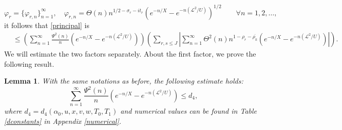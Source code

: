 \documentclass[reqno]{amsart}
\newtheorem{lemma}[theorem]{Lemma}
\numberwithin{equation}{section}
\theoremstyle{remark}
\begin{document}
    \[
\varphi_{r}=\{\varphi_{r,n}\}_{n=1}^{\infty},\quad \varphi_{r,n}=\Theta(n)n^{1/2-\sigma_r-it_r}(e^{-n/X}-e^{-n(\mathscr{L}^2/U)})^{1/2}\qquad \forall n=1,2,\dots,
\]
it follows that \eqref{principal} is 
\begin{equation}\label{afterhalaszmont}
 \begin{aligned}
    &\le \left(\sum_{n=1}^{\infty}\frac{\Psi^2(n)}{n}(e^{-n/X}-e^{-n(\mathscr{L}^2/U)})\right)\left(\sum_{r,s\le J}\left|\sum_{n=1}^\infty\Theta^2(n)n^{1-\rho_r-\overline{\rho_k}}(e^{-n/X}-e^{-n(\mathscr{L}^2/U)})\right|\right).
\end{aligned}
\end{equation}
We will estimate the two factors separately. About the first factor, we prove the following result.
\begin{lemma}\label{an2bn}
    With the same notations as before, the following estimate holds:
    \[
     \sum_{n=1}^{\infty}\frac{\Psi^2(n)}{n}(e^{-n/X}-e^{-n(\mathscr{L}^2/U)})\le d_4,
    \]
    where $d_4=d_4(\alpha_0,u,x,v,w,T_0,T_1)$ and numerical values can be found in Table \ref{dconstants} in Appendix \ref{numerical}.   
\end{lemma}
\end{document}
